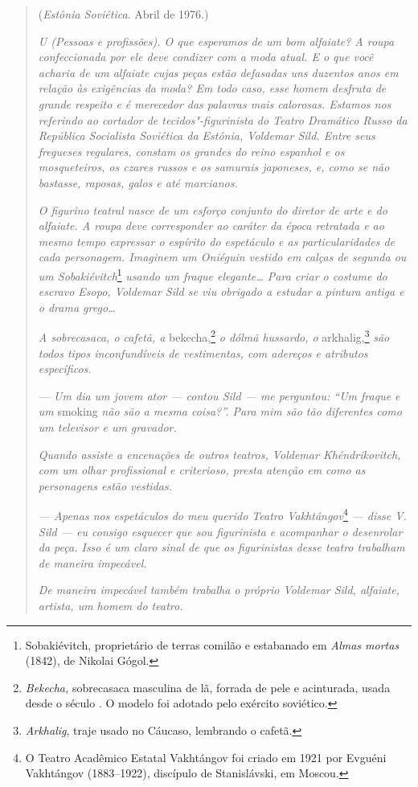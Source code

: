 \begin{quotation}
\begin{flushright}
(\emph{Estônia Soviética}. Abril de 1976.)
\end{flushright}
\vspace{4pt}
\noindent\emph{U (Pessoas e profissões). O que esperamos
de um bom alfaiate? A roupa confeccionada por ele deve condizer com a
moda atual. E o que você acharia de um alfaiate cujas peças estão
defasadas uns duzentos anos em relação às exigências da moda? Em todo
caso, esse homem desfruta de grande respeito e é merecedor das palavras
mais calorosas. Estamos nos referindo ao cortador de tecidos"-figurinista do Teatro
Dramático Russo da República Socialista Soviética da Estônia, Voldemar
Sild. Entre seus fregueses regulares, constam os grandes do reino
espanhol e os mosqueteiros, os czares russos e os samurais japoneses, e,
como se não bastasse, raposas, galos e até marcianos.}

\emph{O figurino teatral nasce de um esforço conjunto do diretor de arte
e do alfaiate. A roupa deve corresponder ao caráter da época retratada e
ao mesmo tempo expressar o espírito do espetáculo e as particularidades
de cada personagem. Imaginem um Oniéguin vestido em calças de segunda ou
um Sobakiévitch}\footnote{Sobakiévitch, proprietário de terras comilão e
  estabanado em \emph{Almas mortas} (1842), de Nikolai Gógol.}
\emph{usando um fraque elegante\ldots{} Para criar o costume do escravo
Esopo, Voldemar Sild se viu obrigado a estudar a pintura antiga e o
drama grego\ldots{}}

\emph{A sobrecasaca, o cafetã, a} bekecha,\footnote{\emph{Bekecha,}
  sobrecasaca masculina de lã, forrada de pele e acinturada, usada desde
  o século . O modelo foi adotado pelo exército soviético.} \emph{o
dólmã hussardo, o} arkhalig,\footnote{\emph{Arkhalig}, traje
  usado no Cáucaso, lembrando o cafetã.} \emph{são todos tipos
inconfundíveis de vestimentas, com adereços e atributos específicos.}

\emph{--- Um dia um jovem ator --- contou Sild --- me perguntou: ``Um
fraque e um} smoking \emph{não são a mesma coisa?''. Para mim são tão
diferentes como um televisor e um gravador.}

\emph{Quando assiste a encenações de outros teatros, Voldemar
Khéndrikovitch, com um olhar profissional e criterioso, presta atenção
em como as personagens estão vestidas.}

\emph{--- Apenas nos espetáculos do meu querido Teatro
Vakhtángov}\footnote{O Teatro Acadêmico Estatal Vakhtángov foi criado em
  1921 por Evguéni Vakhtángov (1883--1922), discípulo de Stanislávski,
  em Moscou.} \emph{--- disse V. Sild --- eu consigo esquecer que sou
figurinista e acompanhar o desenrolar da peça. Isso é um claro sinal de
que os figurinistas desse teatro trabalham de maneira impecável.}

\emph{De maneira impecável também trabalha o próprio Voldemar Sild,
alfaiate, artista, um homem do teatro.}
\end{quotation}


